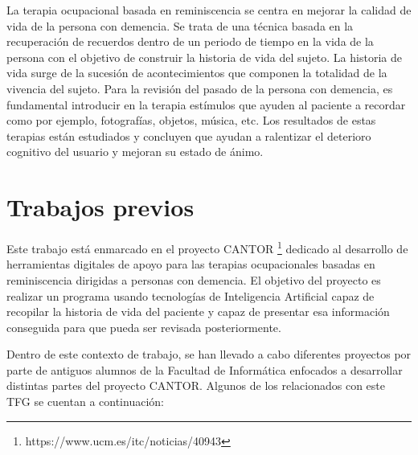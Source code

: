 La terapia ocupacional basada en reminiscencia se centra en mejorar la calidad de vida de la persona con demencia. Se trata de una técnica basada en la recuperación de recuerdos dentro de un periodo de tiempo en la vida de la persona con el objetivo de construir la historia de vida del sujeto. La historia de vida surge de la sucesión de acontecimientos que componen la totalidad de la vivencia del sujeto. Para la revisión del pasado de la persona con demencia, es fundamental introducir en la terapia estímulos que ayuden al paciente a recordar como por ejemplo, fotografías, objetos, música, etc. Los resultados de estas terapias están estudiados y concluyen que ayudan a ralentizar el deterioro cognitivo del usuario y mejoran su estado de ánimo.


\section{Trabajos previos}

Este trabajo está enmarcado en el proyecto CANTOR \footnote{https://www.ucm.es/itc/noticias/40943} dedicado al desarrollo de herramientas digitales de apoyo para las terapias ocupacionales basadas en reminiscencia dirigidas a personas con demencia. El objetivo del proyecto es realizar un programa usando tecnologías de Inteligencia Artificial capaz de recopilar la historia de vida del paciente y capaz de presentar esa información conseguida para que pueda ser revisada posteriormente. 

Dentro de este contexto de trabajo, se han llevado a cabo diferentes proyectos por parte de antiguos alumnos de la Facultad de Informática enfocados a desarrollar distintas partes del proyecto CANTOR. Algunos de los relacionados con este TFG se cuentan a continuación: 

